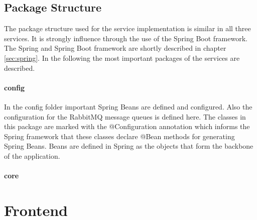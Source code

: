 \subsection{Package Structure}
\label{sec:folder_structure}
The package structure used for the service implementation is similar in all three services.
It is strongly influence through the use of the Spring Boot framework.
The Spring and Spring Boot framework are shortly described in chapter \ref{sec:spring}.
In the following the most important packages of the services are described.

\paragraph{config}
In the config folder important Spring Beans are defined and configured.
Also the configuration for the RabbitMQ message queues is defined here.
The classes in this package are marked with the @Configuration annotation which informs the Spring framework that these classes declare @Bean methods for generating Spring Beans.
Beans are defined in Spring as the objects that form the backbone of the application.

\paragraph{core}



\section{Frontend}
\label{sec:frontend}